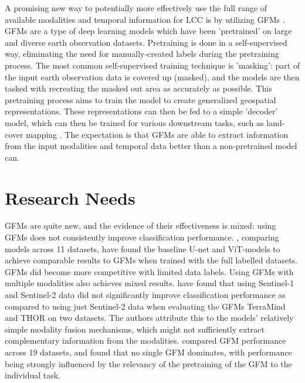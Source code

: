 \documentclass[a4paper,12pt]{article}
\begin{document}
A promising new way to potentially more effectively use the full range of available modalities and temporal information for \ac{LCC} is by utilizing \acp{GFM} \citep{yangSurveyMultimodalGeospatial2025}. \acp{GFM} are a type of deep learning models which have been 'pretrained' on large and diverse earth observation datasets. Pretraining is done in a self-supervised way, eliminating the need for manually-created labels during the pretraining process. The most common self-supervised training technique is 'masking': part of the input earth observation data is covered up (masked), and the models are then tasked with recreating the masked out area as accurately as possible. This pretraining process aims to train the model to create generalized geospatial representations. These representations can then be fed to a simple 'decoder' model, which can then be trained for various downstream tasks, such as land-cover mapping \citep{tuiaArtificialIntelligenceAdvance2025}. The expectation is that \acp{GFM} are able to extract information from the input modalities and temporal data better than a non-pretrained model can.

\section{Research Needs}
\acp{GFM} are quite new, and the evidence of their effectiveness is mixed: using \acp{GFM} does not consistently improve classification performance. \citet{marsocciPANGAEAGlobalInclusive2025}, comparing models across 11 datasets, have found the baseline U-net and \ac{ViT}-models to achieve comparable results to \acp{GFM} when trained with the full labelled datasets. \acp{GFM} did become more competitive with limited data labels. Using \acp{GFM} with multiple modalities also achieves mixed results. \citet{schindleggerNowWeKnow2026} have found that using Sentinel-1 and Sentinel-2 data did not significantly improve classification performance as compared to using just Sentinel-2 data when evaluating the \acp{GFM} TerraMind \citep{jakubikTerraMindLargeScaleGenerative2026} and THOR \citep{forgaardTHORVersatileFoundation2026} on two datasets. The authors attribute this to the models' relatively simple modality fusion mechanisms, which might not sufficiently extract complementary information from the modalities. \citet{simumbaGEOBench2PerformanceCapability2026} compared \ac{GFM} performance across 19 datasets, and found that no single \ac{GFM} dominates, with performance being strongly influenced by the relevancy of the pretraining of the \ac{GFM} to the individual task.
\end{document}
